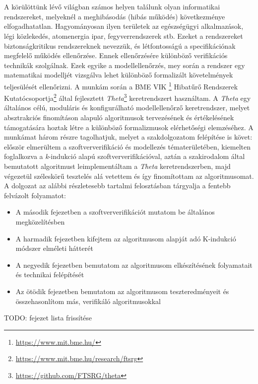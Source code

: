 \chapter{\bevezetes}

A körülöttünk lévő világban számos helyen találunk olyan informatikai rendszereket, melyeknél a meghibásodás (hibás működés) következménye elfogadhatatlan. Hagyományosan ilyen területek az egészségügyi alkalmazások, légi közlekedés, atomenergia ipar, fegyverrendszerek stb. Ezeket a rendszereket biztonságkritikus rendszereknek nevezzük, és létfontosságú a specifikációnak megfelelő működés ellenőrzése. Ennek ellenőrzésére különböző verifikációs technikák szolgálnak. Ezek egyike a modellellenőrzés, mey során a rendszer egy matematikai modelljét vizsgálva lehet különböző formalizált követelmények teljesülését ellenőrizni.
\newline
\newline
A munkám során a BME VIK \bmemit\footnote{\url{https://www.mit.bme.hu/}} Hibatűrő Rendszerek Kutatócsoportja\footnote{\url{https://www.mit.bme.hu/research/ftsrg}} által fejlesztett \emph{Theta}\footnote{\url{https://github.com/FTSRG/theta}} keretrendszert használtam. A \emph{Theta} egy általános célú, moduláris és konfigurálható modellellenőrző keretrendszer, melyet absztrakciós finomításon alapuló algoritmusok tervezésének és értékelésének támogatására hoztak létre a különböző formalizmusok elérhetőségi elemzéséhez.
\newline
\newline
A munkámat három részre tagolhatjuk, melyet a szakdolgozatom felépítése is követ: először elmerültem a szoftververifikáció és modellezés tématerületében, kiemelten foglalkozva a \emph{k}-indukció alapú szoftververifikációval, aztán a szakirodalom által bemutatott algoritmust leimplementáltam a \emph{Theta} keretrendszerben, majd végezetül széleskörű tesztelés alá vetettem és így finomítottam az algoritmusomat.
\newline
\newline
A dolgozat az alábbi részletesebb tartalmi felosztásban tárgyalja a fentebb felvázolt folyamatot:
\begin{itemize}
	\item A második fejezetben a szoftververifikációt mutatom be általános megközelítésben
	\item A harmadik fejezetben kifejtem az algoritmusom alapját adó K-indukció módszer elméleti hátterét
	\item A negyedik fejezetben bemutatom az algoritmusom elkészítésének folyamatait és technikai felépítését
	\item Az ötödik fejezetben bemutatom az algoritmusom teszteredményeit és összehasonlítom más, verifikáló algoritmusokkal
\end{itemize}
TODO: fejezet lista frissítése